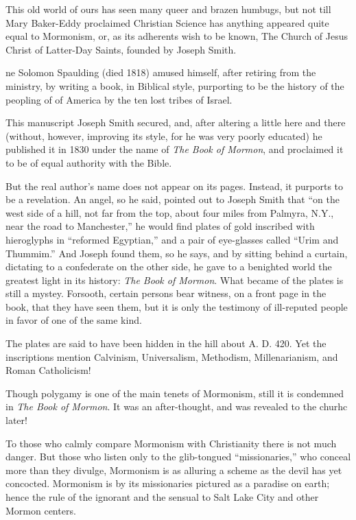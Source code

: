 \documentclass[
]{book}
\begin{document}
This old world of ours has seen many queer and brazen humbugs, but not till Mary Baker-Eddy proclaimed Christian Science has anything appeared quite equal to Mormonism, or, as its adherents wish to be known, The Church of Jesus Christ of Latter-Day Saints, founded by Joseph Smith.

ne Solomon Spaulding (died 1818) amused himself, after retiring from the ministry, by writing a book, in Biblical style, purporting to be the history of the peopling of of America by the ten lost tribes of Israel.

This manuscript Joseph Smith secured, and, after altering a little here and there (without, however, improving its style, for he was very poorly educated) he published it in 1830 under the name of \emph{The Book of Mormon}, and proclaimed it to be of equal authority with the Bible.

But the real author's name does not appear on its pages. Instead, it purports to be a revelation. An angel, so he said, pointed out to Joseph Smith that ``on the west side of a hill, not far from the top, about four miles from Palmyra, N.Y., near the road to Manchester,'' he would find plates of gold inscribed with hieroglyphs in ``reformed Egyptian,'' and a pair of eye-glasses called ``Urim and Thummim.'' And Joseph found them, so he says, and by sitting behind a curtain, dictating to a confederate on the other side, he gave to a benighted world the greatest light in its history: \emph{The Book of Mormon}. What became of the plates is still a mystey. Forsooth, certain persons bear witness, on a front page in the book, that they have seen them, but it is only the testimony of ill-reputed people in favor of one of the same kind.

The plates are said to have been hidden in the hill about A. D. 420. Yet the inscriptions mention Calvinism, Universalism, Methodism, Millenarianism, and Roman Catholicism!

Though polygamy is one of the main tenets of Mormonism, still it is condemned in \emph{The Book of Mormon}. It was an after-thought, and was revealed to the churhc later!

To those who calmly compare Mormonism with Christianity there is not much danger. But those who listen only to the glib-tongued ``missionaries,'' who conceal more than they divulge, Mormonism is as alluring a scheme as the devil has yet concocted. Mormonism is by its missionaries pictured as a paradise on earth; hence the rule of the ignorant and the sensual to Salt Lake City and other Mormon centers.
\end{document}
